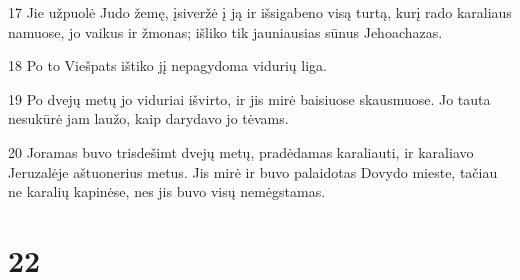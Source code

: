 \par 17 Jie užpuolė Judo žemę, įsiveržė į ją ir išsigabeno visą turtą, kurį rado karaliaus namuose, jo vaikus ir žmonas; išliko tik jauniausias sūnus Jehoachazas. 
\par 18 Po to Viešpats ištiko jį nepagydoma vidurių liga. 
\par 19 Po dvejų metų jo viduriai išvirto, ir jis mirė baisiuose skausmuose. Jo tauta nesukūrė jam laužo, kaip darydavo jo tėvams. 
\par 20 Joramas buvo trisdešimt dvejų metų, pradėdamas karaliauti, ir karaliavo Jeruzalėje aštuonerius metus. Jis mirė ir buvo palaidotas Dovydo mieste, tačiau ne karalių kapinėse, nes jis buvo visų nemėgstamas.



\chapter{22}


